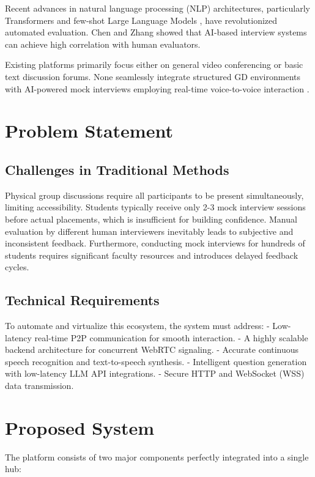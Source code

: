 \documentclass[conference]{IEEEtran}
\begin{document}
Recent advances in natural language processing (NLP) architectures, particularly Transformers \cite{b3} and few-shot Large Language Models \cite{b4}, have revolutionized automated evaluation. Chen and Zhang \cite{b5} showed that AI-based interview systems can achieve high correlation with human evaluators. 

Existing platforms primarily focus either on general video conferencing or basic text discussion forums. None seamlessly integrate structured GD environments with AI-powered mock interviews employing real-time voice-to-voice interaction \cite{b14}.

\section{Problem Statement}

\subsection{Challenges in Traditional Methods}
Physical group discussions require all participants to be present simultaneously, limiting accessibility. Students typically receive only 2-3 mock interview sessions before actual placements, which is insufficient for building confidence. Manual evaluation by different human interviewers inevitably leads to subjective and inconsistent feedback. Furthermore, conducting mock interviews for hundreds of students requires significant faculty resources and introduces delayed feedback cycles.

\subsection{Technical Requirements}
To automate and virtualize this ecosystem, the system must address:
- Low-latency real-time P2P communication for smooth interaction.
- A highly scalable backend architecture for concurrent WebRTC signaling.
- Accurate continuous speech recognition and text-to-speech synthesis.
- Intelligent question generation with low-latency LLM API integrations.
- Secure HTTP and WebSocket (WSS) data transmission.

\section{Proposed System}

The platform consists of two major components perfectly integrated into a single hub:
\end{document}
